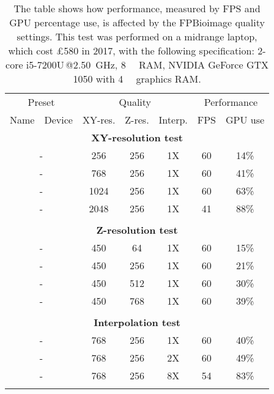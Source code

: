 \begin{table}
\caption[FPBioimage: Adjustable quality settings allow high performance on consumer-grade computers]{\label{tab:fpbPerformance}The table shows how performance, measured by FPS and GPU percentage use, is affected by the FPBioimage quality settings. This test was performed on a midrange laptop, which cost £580 in 2017, with the following specification: 2-core i5-7200U\,@\SI{2.50}{\giga\hertz}, \SI{8}{\giga\byte} RAM, NVIDIA GeForce GTX 1050 with \SI{4}{\giga\byte} graphics RAM.}
\centering
\begin{tabular}{|l l|c c c|c c|}
\hline
\multicolumn{2}{|c|}{Preset} & \multicolumn{3}{c|}{Quality} & \multicolumn{2}{c|}{Performance} \\
\multicolumn{1}{|c}{Name} & \multicolumn{1}{c|}{Device} & XY-res. & Z-res. & \multicolumn{1}{c|}{Interp.} & FPS & \multicolumn{1}{c|}{GPU use} \\
\hline

\multicolumn{7}{|c|}{\textbf{XY-resolution test}} \\ \hline
\multicolumn{2}{|c|}{-} & 256 & 256 & 1X & 60 & 14\% \\
\multicolumn{2}{|c|}{-} & 768 & 256 & 1X & 60 & 41\% \\
\multicolumn{2}{|c|}{-} & 1024 & 256 & 1X & 60 & 63\% \\
\multicolumn{2}{|c|}{-} & 2048 & 256 & 1X & 41 & 88\% \\
 & & & & & & \\
\hline

\multicolumn{7}{|c|}{\textbf{Z-resolution test}} \\ \hline
\multicolumn{2}{|c|}{-} & 450 & 64 & 1X & 60 & 15\% \\
\multicolumn{2}{|c|}{-} & 450 & 256 & 1X & 60 & 21\% \\
\multicolumn{2}{|c|}{-} & 450 & 512 & 1X & 60 & 30\% \\
\multicolumn{2}{|c|}{-} & 450 & 768 & 1X & 60 & 39\% \\
 & & & & & & \\
\hline

\multicolumn{7}{|c|}{\textbf{Interpolation test}} \\ \hline
\multicolumn{2}{|c|}{-} & 768 & 256 & 1X & 60 & 40\% \\
\multicolumn{2}{|c|}{-} & 768 & 256 & 2X & 60 & 49\% \\
\multicolumn{2}{|c|}{-} & 768 & 256 & 8X & 54 & 83\% \\
 & & & & & & \\
\hline


\end{tabular}
\end{table}
